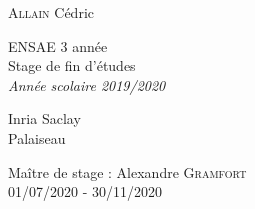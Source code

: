 
\clearpage
\thispagestyle{empty}

\begin{minipage}{7.6cm}
  \begin{flushleft} \Large
    \textsc{Allain} Cédric
  \end{flushleft}
\end{minipage}
\begin{minipage}{7.6cm}
  \begin{flushright} \Large
    ENSAE 3 année\\
    Stage de fin d'études\\
    \textit{Année scolaire 2019/2020}
  \end{flushright}
\end{minipage}

 \vspace*{5cm}

\begin{center}
\end{center}

\vfill
    
\begin{minipage}{6cm}
  \begin{flushleft} \Large
    Inria Saclay\\
    Palaiseau
  \end{flushleft}
\end{minipage}
\begin{minipage}{9.2cm}
  \begin{flushright} \Large
    Maître de stage : Alexandre \textsc{Gramfort}\\
    01/07/2020 - 30/11/2020
  \end{flushright}
\end{minipage}    


\clearpage